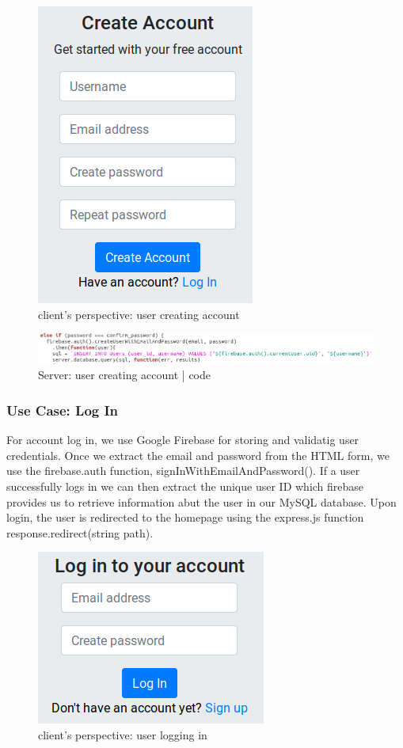 \documentclass[letter, 12pt, titlepage]{article}
\begin{document}
	\begin{figure}[h!]
		\centering
		\includegraphics[scale=0.50]{create-account.png}
		\caption{client's perspective: user creating account}
	\end{figure}

	\begin{figure}[h!]
		\centering
		\includegraphics[scale=0.50]{create-account-code.png}
		\caption{Server: user creating account | code}
	\end{figure}


\newpage
	
	\subsubsection{Use Case: Log In}
For account log in, we use Google Firebase for storing and validatig user credentials. Once we extract the email and password from the HTML form, we use the firebase.auth function, signInWithEmailAndPassword(). If a user successfully logs in we can then extract the unique user ID which firebase provides us to retrieve information abut the user in our MySQL database. Upon login, the user is redirected to the homepage using the express.js function response.redirect(string path).

	\begin{figure}[h!]
		\centering
		\includegraphics[scale=0.50]{login.png}
		\caption{client's perspective: user logging in}
	\end{figure}
\end{document}
